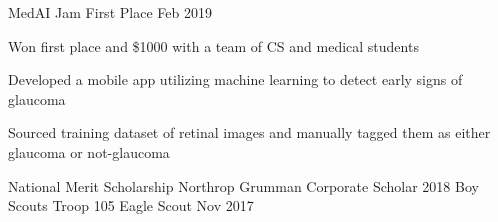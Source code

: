 
\begin{cventries}
  \cventry
    {MedAI Jam} %
    {First Place} %
    {} %
    {Feb 2019} %
    {
      \begin{cvitems}
        \item {Won first place and \$1000 with a team of CS and medical students}
        \item {Developed a mobile app utilizing machine learning to detect early signs of glaucoma}
        \item {Sourced training dataset of retinal images and manually tagged them as either glaucoma or not-glaucoma}
      \end{cvitems}
    } %

  \cventry
    {National Merit Scholarship}
    {Northrop Grumman Corporate Scholar}
    {}
    {2018}
    {}  
  \vspace{-1.5mm}
  \cventry
    {Boy Scouts Troop 105}
    {Eagle Scout}
    {}
    {Nov 2017}
    {}

\end{cventries}